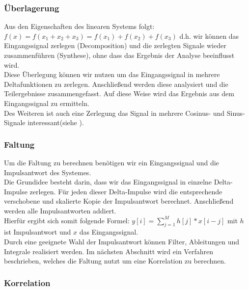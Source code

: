 \documentclass{article} %
\begin{document}
		\subsubsection{Überlagerung}

		Aus den Eigenschaften des linearen Systems folgt: $f(x) = f(x_1+x_2+x_3) = f(x_1)+f(x_2)+f(x_3)$ d.h. wir können das Eingangssignal zerlegen (Decomposition) und die zerlegten Signale wieder zusammenführen (Synthese), ohne dass das Ergebnis der Analyse beeinflusst wird.\\
		Diese Überlegung können wir nutzen um das Eingangssignal in mehrere Deltafunktionen zu zerlegen. Anschließend werden diese analysiert und die Teilergebnisse zusammengefasst. Auf diese Weise wird das Ergebnis aus dem Eingangssignal zu ermitteln.\\
		Des Weiteren ist auch eine Zerlegung das Signal in mehrere Cosinus- und Sinus-Signale interessant(siehe \label{sec-Fourier}).
		\subsubsection{Faltung}
		Um die Faltung zu berechnen benötigen wir ein Eingangssignal und die Impulsantwort des Systemes.\\
		Die Grundidee besteht darin, dass wir das Eingangssignal in einzelne Delta-Impulse zerlegen. Für jeden dieser Delta-Impulse wird die entsprechende verschobene und skalierte Kopie der Impulsantwort berechnet. Anschließend werden alle Impulsantworten addiert.\\
		Hierfür ergibt sich somit folgende Formel: $y[i] = \sum_{j=1}^{M}h[j]*x[i-j]$ mit $h$ ist Impulsantwort und $x$ das Eingangssignal.\\
		Durch eine geeignete Wahl der Impulsantwort können Filter, Ableitungen und Integrale realisiert werden. Im nächsten Abschnitt wird ein Verfahren beschrieben, welches die Faltung nutzt um eine Korrelation zu berechnen.
		\subsubsection{Korrelation}






\end{document}
